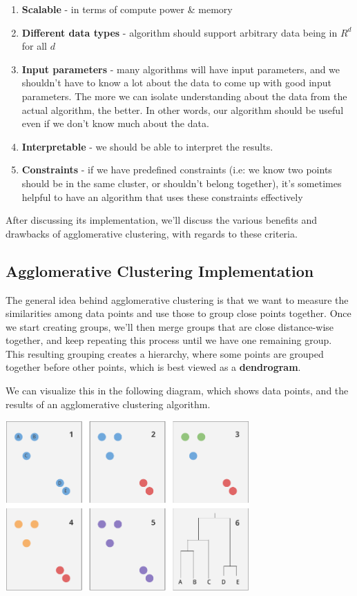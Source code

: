 \documentclass{article}
\begin{document}
\begin{enumerate}
	\item \textbf{Scalable} - in terms of compute power \& memory
	\item \textbf{Different data types} - algorithm should support arbitrary data being in $R^d$ for all $d$
	\item \textbf{Input parameters} - many algorithms will have input parameters, and we shouldn't have to know a lot about the data to come up with good input parameters. The more we can isolate understanding about the data from the actual algorithm, the better. In other words, our algorithm should be useful even if we don't know much about the data.
	\item \textbf{Interpretable} - we should be able to interpret the results.
	\item \textbf{Constraints} - if we have predefined constraints (i.e: we know two points should be in the same cluster, or shouldn't belong together), it's sometimes helpful to have an algorithm that uses these constraints effectively
\end{enumerate}

After discussing its implementation, we'll discuss the various benefits and drawbacks of agglomerative clustering, with regards to these criteria.

\subsection{Agglomerative Clustering Implementation}

The general idea behind agglomerative clustering is that we want to measure the similarities among data points and use those to group close points together. Once we start creating groups, we'll then merge groups that are close distance-wise together, and keep repeating this process until we have one remaining group. This resulting grouping creates a hierarchy, where some points are grouped together before other points, which is best viewed as a \textbf{dendrogram}.

We can visualize this in the following diagram, which shows data points, and the results of an agglomerative clustering algorithm.

\begin{minipage}{\linewidth}
\begin{center}
\includegraphics[width=0.70\textwidth]{dendrogram2.png}
\end{center}
\end{minipage}
\end{document}
